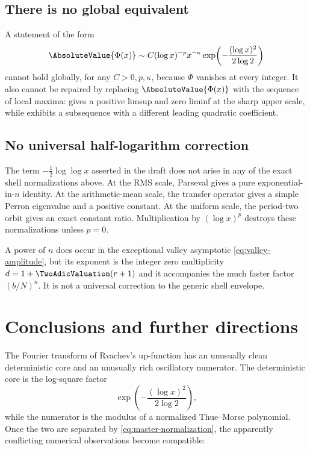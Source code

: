 \documentclass[11pt,oneside]{article}
\theoremstyle{definition}
\theoremstyle{remark}
\newcommand{\Phiup}{\Phi}
\begin{document}
\subsection{There is no global equivalent}

A statement of the form
\[
 \AbsoluteValue{\Phiup(x)}\sim C(\log x)^{-p}x^{-\kappa}
 \exp\!\left(-\frac{(\log x)^2}{2\log2}\right)
\]
cannot hold globally, for any $C>0,p,\kappa$, because $\Phiup$ vanishes at every integer.
It also cannot be repaired by replacing $\AbsoluteValue{\Phiup(x)}$ with the sequence of local maxima:
 gives a positive limsup and zero liminf at the sharp upper
scale, while  exhibits a subsequence with a different leading
quadratic coefficient.

\subsection{No universal half-logarithm correction}

The term $-\tfrac12\log\log x$ asserted in the draft does not arise in any of the exact
shell normalizations above.  At the RMS scale, Parseval gives a pure exponential-in-$n$
identity.  At the arithmetic-mean scale, the transfer operator gives a simple Perron
eigenvalue and a positive constant.  At the uniform scale, the period-two orbit gives an
exact constant ratio.  Multiplication by $(\log x)^p$ destroys these normalizations unless
$p=0$.

A power of $n$ does occur in the exceptional valley asymptotic
\eqref{eq:valley-amplitude}, but its exponent is the integer zero multiplicity
$d=1+\TwoAdicValuation(r+1)$ and it accompanies the much faster factor $(b/N)^n$.  It is not a universal
correction to the generic shell envelope.

\section{Conclusions and further directions}
\label{sec:conclusion}

The Fourier transform of Rvachev's up-function has an unusually clean deterministic core
and an unusually rich oscillatory numerator.  The deterministic core is the log-square
factor
\[
 \exp\!\left(-\frac{(\log x)^2}{2\log2}\right),
\]
while the numerator is the modulus of a normalized Thue--Morse polynomial.  Once the two
are separated by \eqref{eq:master-normalization}, the apparently conflicting numerical
observations become compatible:
\end{document}
